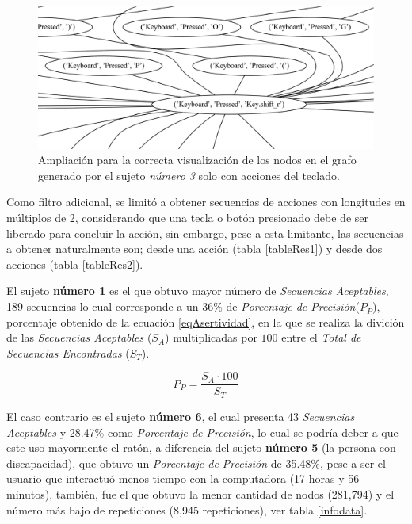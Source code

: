 \begin{figure}[h]
\centering
\includegraphics[width=1.0 \columnwidth]{chap5/Imagenes/MoreZKB150.eps}
\caption{Ampliaci\'on para la correcta visualizaci\'on de los nodos en el
 grafo generado por el sujeto \emph{n\'umero 3} solo con acciones del
 teclado.}
\label{fig:morezKB}
\end{figure}


Como filtro adicional, se limit\'o a obtener secuencias de 
 acciones con longitudes en m\'ultiplos de 2, considerando que una tecla o 
 bot\'on presionado debe de ser liberado para concluir la acci\'on, sin 
 embargo, pese a esta limitante, las secuencias a obtener naturalmente son; 
 desde una acci\'on (tabla \ref{tableRes1}) y desde dos acciones (tabla 
 \ref{tableRes2}). 
 

El sujeto \textbf{n\'umero 1} es el que obtuvo mayor n\'umero de 
 \emph{Secuencias Aceptables}, 189 secuencias lo cual corresponde a un 36\% de
 \emph{Porcentaje de Precisi\'on}($P_P$), porcentaje obtenido de la ecuaci\'on 
 \ref{eqAsertividad}, en la que se realiza la divici\'on de las \emph{Secuencias 
 Aceptables} ($S_A$) multiplicadas por $100$ entre el \emph{Total de Secuencias 
 Encontradas} ($S_T$).


\begin{equation}
P_P = \dfrac{ S_A \cdot 100}{S_T}
\label{eqAsertividad}
\end{equation}


El caso contrario es el sujeto \textbf{n\'umero 6}, el cual presenta 43 
 \emph{Secuencias Aceptables} y 28.47\% como \emph{Porcentaje de Precisi\'on}, 
 lo cual se podr\'ia deber a que este uso mayormente el rat\'on, a diferencia 
 del sujeto \textbf{n\'umero 5} (la persona con discapacidad), que obtuvo un 
 \emph{Porcentaje de Precisi\'on} de 35.48\%, pese a ser el usuario que 
 interactu\'o menos tiempo con la computadora (17 horas y 56 minutos), 
 tambi\'en, fue el que obtuvo la menor cantidad de nodos (281,794) y el n\'umero
 m\'as bajo de repeticiones (8,945 repeticiones), ver tabla \ref{infodata}.

